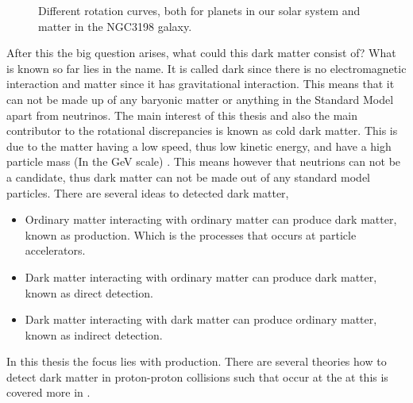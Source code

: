  \begin{figure}[h] %
    \hfill
    \caption{Different rotation curves, both for planets in our solar system and matter in the NGC3198 galaxy.}
    \label{fig:rotation}
  \end{figure}
After this the big question arises, what could this dark matter consist of? What is known so far lies in the name. It is called dark since there is no electromagnetic interaction and matter since it has gravitational interaction. This means that it can not be made up of any baryonic matter or anything in the Standard Model apart from neutrinos. The main interest of this thesis and also the main contributor to the rotational discrepancies is known as cold dark matter. This is due to the matter having a low speed, thus low kinetic energy, and have a high particle mass (In the GeV scale) \citep{Goodman:2010,CERN-PH-EP-2012-210,Jungman:1996}. This means however that neutrions can not be a candidate, thus dark matter can not be made out of any standard model particles. 
There are several ideas to detected dark matter, \citep{Jungman:1996}
\begin{itemize}
\item Ordinary matter interacting with ordinary matter can produce dark matter, known as production. Which is the processes that occurs at particle accelerators.
\item Dark matter interacting with ordinary matter can produce dark matter, known as direct detection.
\item Dark matter interacting with dark matter can produce ordinary matter, known as indirect detection.
\end{itemize} 
In this thesis the focus lies with production. There are several theories how to detect dark matter in proton-proton collisions such that occur at the \abbrLHC at \abbrCERN this is covered more in . 

